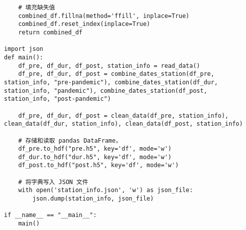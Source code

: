 \begin{lstlisting}
    # 填充缺失值
    combined_df.fillna(method='ffill', inplace=True)
    combined_df.reset_index(inplace=True)
    return combined_df

import json
def main():
    df_pre, df_dur, df_post, station_info = read_data()
    df_pre, df_dur, df_post = combine_dates_station(df_pre, station_info, "pre-pandemic"), combine_dates_station(df_dur, station_info, "pandemic"), combine_dates_station(df_post, station_info, "post-pandemic")
    
    df_pre, df_dur, df_post = clean_data(df_pre, station_info), clean_data(df_dur, station_info), clean_data(df_post, station_info)  

    # 存储和读取 pandas DataFrame，
    df_pre.to_hdf("pre.h5", key='df', mode='w')
    df_dur.to_hdf("dur.h5", key='df', mode='w')
    df_post.to_hdf("post.h5", key='df', mode='w')

    # 将字典写入 JSON 文件
    with open('station_info.json', 'w') as json_file:
        json.dump(station_info, json_file)

if __name__ == "__main__":
    main()
    

\end{lstlisting}
